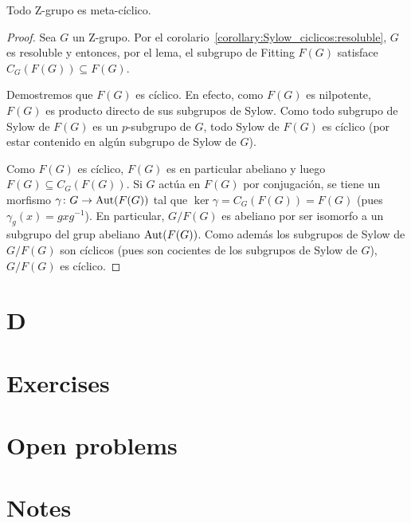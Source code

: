 \begin{theorem}
	\label{theorem:Z=>metacyclic}
	Todo Z-grupo es meta-cíclico.
\end{theorem}

\begin{proof}
	Sea $G$ un Z-grupo.	Por el
	corolario~\ref{corollary:Sylow_ciclicos:resoluble}, $G$ es resoluble y
	entonces, por el lema, el subgrupo de Fitting $F(G)$ satisface
	$C_G(F(G))\subseteq F(G)$. 
	
	Demostremos que $F(G)$ es cíclico. En efecto, como $F(G)$ es nilpotente,
	$F(G)$ es producto directo de sus subgrupos de Sylow. Como todo subgrupo de
	Sylow de $F(G)$ es un $p$-subgrupo de $G$, todo Sylow de $F(G)$ es cíclico
	(por estar contenido en algún subgrupo de Sylow de $G$). 

	Como $F(G)$ es cíclico, $F(G)$ es en particular abeliano y luego
	$F(G)\subseteq C_G(F(G))$. Si $G$ actúa en $F(G)$ por conjugación, se tiene
	un morfismo $\gamma\colon G\to\operatorname{Aut}(F(G))$ tal que
	$\ker\gamma=C_G(F(G))=F(G)$ (pues $\gamma_g(x)=gxg^{-1}$). En particular,
	$G/F(G)$ es abeliano por ser isomorfo a un subgrupo del grup abeliano
	$\operatorname{Aut}(F(G))$. Como además los subgrupos de Sylow de $G/F(G)$ son cíclicos (pues
	son cocientes de los subgrupos de Sylow de $G$), $G/F(G)$ es cíclico.
\end{proof}

\section*{D}

\section*{Exercises}

\section*{Open problems}

\section*{Notes}



